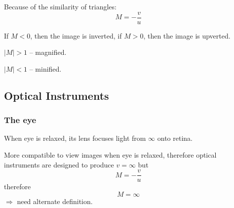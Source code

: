 \documentclass[10pt]{article}
\begin{document}
Because of the similarity of triangles:
\begin{equation}\boxed{
M = -\frac{v}{u}
}\end{equation}

If $M < 0$, then the image is inverted, if $M > 0$, then the image is upverted.

$|M|>1$ -- magnified.

$|M|<1$ -- minified.

\subsection{Optical Instruments}
\subsubsection{The eye}
When eye is relaxed, its lens focuses light from $\infty$ onto retina.

More compatible to view images when eye is relaxed, therefore optical instruments are designed to produce $v = \infty$ but 
\begin{equation*}
M = -\frac{v}{u}
\end{equation*}
therefore
\begin{equation*}
M = \infty
\end{equation*}
$\Rightarrow$ need alternate definition.
\end{document}
